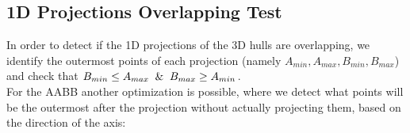 \documentclass{PoliMi_MasterThesis}
\begin{document}
\subsection{1D Projections Overlapping Test} \label{ssec:1d_projection_overlapping_test}
In order to detect if the 1D projections of the 3D hulls are overlapping, we identify the outermost points of each projection (namely $A_{min}, A_{max}, B_{min}, B_{max}$) and check that $B_{min} \leq A_{max} \And B_{max} \geq A_{min}$.\\
For the AABB another optimization is possible, where we detect what points will be the outermost after the projection without actually projecting them, based on the direction of the axis:

\begin{figure}[H]
    \centering
    \quad
	\caption{}
    \label{fig:aabb_projected_extremes}
\end{figure}
\end{document}
